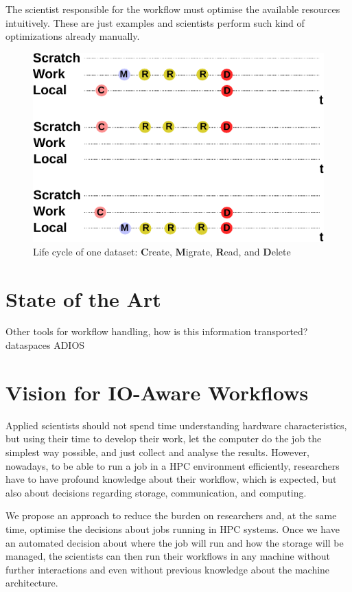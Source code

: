 \documentclass[a4paper]{article}
\begin{document}
{{The scientist responsible for the workflow must optimise the available resources intuitively.
These are just examples and scientists perform such kind of optimizations already manually.




\begin{figure}[H]
  \centering
  \includegraphics[width=0.6\columnwidth]{lifecycle}
  \caption{Life cycle of one dataset: \textbf{C}reate, \textbf{M}igrate, \textbf{R}ead, and \textbf{D}elete}
  \label{fig:lifecycle}
\end{figure}


\section{State of the Art}

Other tools for workflow handling, how is this information transported?
dataspaces
ADIOS


\section{Vision for IO-Aware Workflows}

Applied scientists should not spend time understanding hardware characteristics, but using their time to develop their work, let the computer do the job the simplest way possible, and just collect and analyse the results.
However, nowadays, to be able to run a job in a HPC environment efficiently, researchers have to have profound knowledge about their workflow, which is expected, but also about decisions regarding storage, communication, and computing.

We propose an approach to reduce the burden on researchers and, at the same time, optimise the decisions about jobs running in HPC systems.
Once we have an automated decision about where the job will run and how the storage will be managed, the scientists can then run their workflows in any machine without further interactions and even without previous knowledge about the machine architecture.


}}
\end{document}
